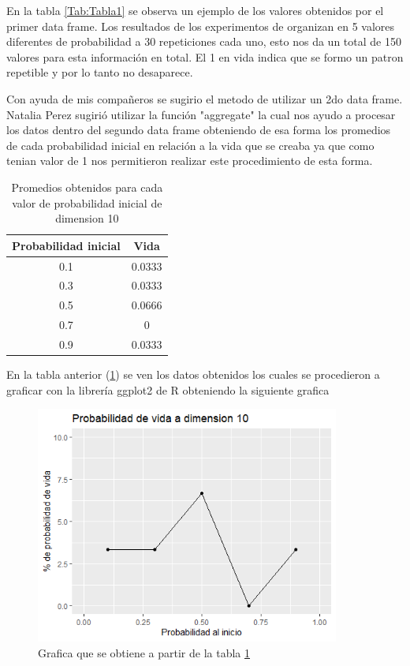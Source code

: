 \documentclass{article}
\begin{document}
En la tabla \ref{Tab:Tabla1} se observa un ejemplo de los valores obtenidos por el primer data frame. Los resultados de los experimentos de organizan en 5 valores diferentes de probabilidad a 30 repeticiones cada uno, esto nos da un total de 150 valores para esta información en total. El 1 en vida indica que se formo un patron repetible y por lo tanto no desaparece.

\vspace{5mm}
Con ayuda de mis compañeros se sugirio el metodo de utilizar un 2do data frame. Natalia Perez sugirió utilizar la función "aggregate" \cite{youtubeaggregate} la cual nos ayudo a procesar los datos dentro del segundo data frame obteniendo de esa forma los promedios de cada probabilidad inicial en relación a la vida que se creaba ya que como tenian valor de 1 nos permitieron realizar este procedimiento de esta forma.

\begin{table}[h!]
\begin{center}
\begin{tabular}{|c|c|}
\hline
Probabilidad inicial & Vida   \\ \hline
0.1 & 0.0333 \\ \hline
0.3 & 0.0333 \\ \hline
0.5 & 0.0666 \\ \hline
0.7 & 0      \\ \hline
0.9 & 0.0333 \\ \hline
\end{tabular}
\caption{Promedios obtenidos para cada valor de probabilidad inicial de dimension 10}
\label{Tab:Tabla2}
\end{center}
\end{table}

En la tabla anterior (\ref{Tab:Tabla2}) se ven los datos obtenidos los cuales se procedieron a graficar con la librería ggplot2 de R \cite{hadley}\cite{youtubePlot} obteniendo la siguiente grafica

\begin{figure} [h!]%
    \centering
    \includegraphics[width=100mm]{Figura1.png} %
    \caption{Grafica que se obtiene a partir de la tabla \ref{Tab:Tabla2}}
    \label{Figura1}
\end{figure}
\end{document}
